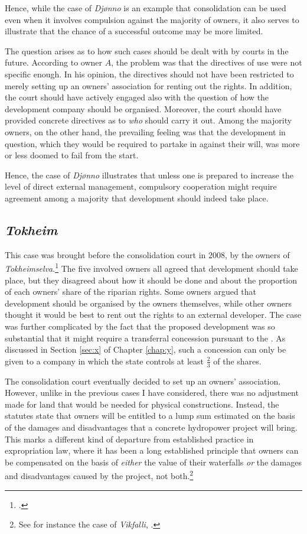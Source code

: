 Hence, while the case of \emph{Djønno} is an example that consolidation can be used even when it involves compulsion against the majority of owners, it also serves to illustrate that the chance of a successful outcome may be more limited.

The question arises as to how such cases should be dealt with by courts in the future. According to owner $A$, the problem was that the directives of use were not specific enough. In his opinion, the directives should not have been restricted to merely setting up an owners' association for renting out the rights. In addition, the court should have actively engaged also with the question of how the development company should be organised. Moreover, the court should have provided concrete directives as to \emph{who} should carry it out. Among the majority owners, on the other hand, the prevailing feeling was that the development in question, which they would be required to partake in against their will, was more or less doomed to fail from the start.

Hence, the case of {\it Djønno} illustrates that unless one is prepared to increase the level of direct external management, compulsory cooperation might require agreement among a majority that development should indeed take place.

\subsection{\emph{Tokheim}}

This case was brought before the consolidation court in 2008, by the owners of \emph{Tokheimselva}.\footcite{tokheim08} The five involved owners all agreed that development should take place, but they disagreed about how it should be done and about the proportion of each owners' share of the riparian rights. Some owners argued that development should be organised by the owners themselves, while other owners thought it would be best to rent out the rights to an external developer. The case was further complicated by the fact that the proposed development was so substantial that it might require a transferral concession pursuant to the \cite{ica17}. As discussed in Section \ref{sec:x} of Chapter \ref{chap:y}, such a concession can only be given to a company in which the state controls at least $\frac{2}{3}$ of the shares.

The consolidation court eventually decided to set up an owners' association. However, unlike in the previous cases I have considered, there was no adjustment made for land that would be needed for physical constructions. Instead, the statutes state that owners will be entitled to a lump sum estimated on the basis of the damages and disadvantages that a concrete hydropower project will bring. This marks a different kind of departure from established practice in expropriation law, where it has been a long established principle that owners can be compensated on the basis of \emph{either} the value of their waterfalls \emph{or} the damages and disadvantages caused by the project, not both.\footnote{See for instance the case of \emph{Vikfalli}, \cite{vikfalli71}.} 

